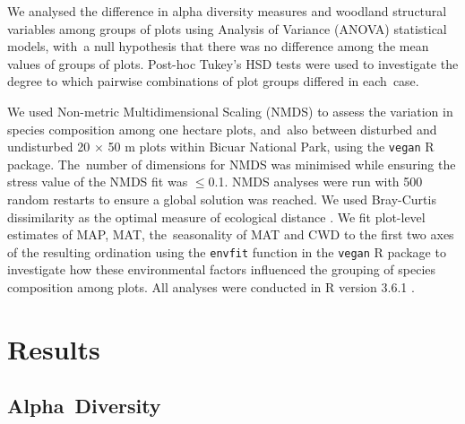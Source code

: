 \documentclass[diversity,article,accept,moreauthors,pdftex]{Definitions/mdpi}
\begin{document}
We analysed the difference in alpha diversity measures and woodland structural variables among groups of plots using Analysis of Variance (ANOVA) statistical models, with~a null hypothesis that there was no difference among the mean values of groups of plots. Post-hoc Tukey's HSD tests were used to investigate the degree to which pairwise combinations of plot groups differed in each~case.

We used Non-metric Multidimensional Scaling (NMDS) to assess the variation in species composition among one hectare plots, and~also between disturbed and undisturbed 20 $\times$ 50 m plots within Bicuar National Park, using the \texttt{vegan} R package. The~number of dimensions for NMDS was minimised while ensuring the stress value of the NMDS fit was $\le$0.1. NMDS analyses were run with 500 random restarts to ensure a global solution was reached. We used Bray-Curtis dissimilarity as the optimal measure of ecological distance \citep{Legendre2013}. We fit plot-level estimates of MAP, MAT, the~seasonality of MAT and CWD to the first two axes of the resulting ordination using the \texttt{envfit} function in the \texttt{vegan} R package to investigate how these environmental factors influenced the grouping of species composition among plots. All analyses were conducted in R version 3.6.1 \citep{RCoreTeam2019}.


\section{Results}
\unskip
\subsection{Alpha~Diversity}
\end{document}
